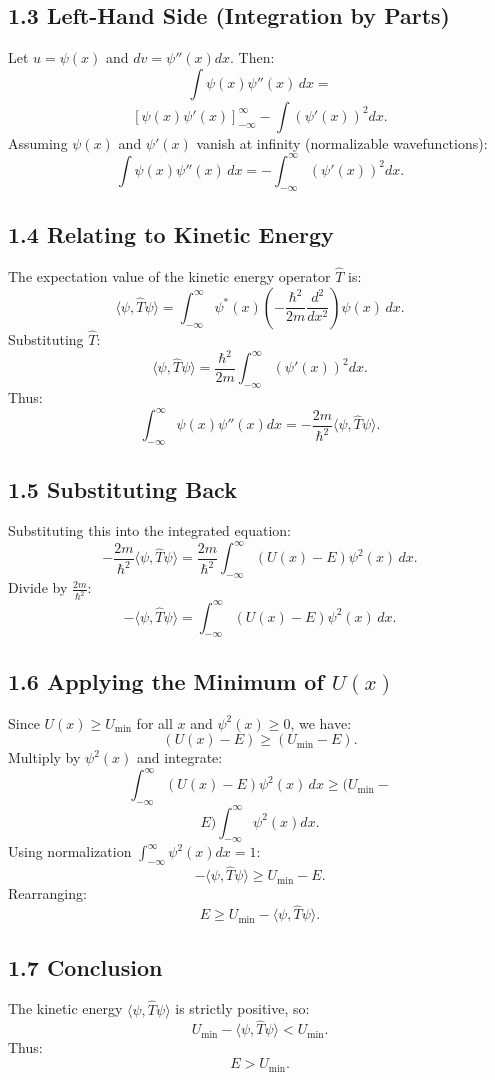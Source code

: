 \documentclass[a4paper,12pt]{article}
\begin{document}
\begin{multicols}{2}
\subsection*{1.3 Left-Hand Side (Integration by Parts)}
Let $u = \psi(x)$ and $dv = \psi''(x) dx$. Then:
\[
\int \psi(x)\psi''(x) \, dx =
\]
\[
\left[\psi(x)\psi'(x)\right]_{-\infty}^\infty - \int \left(\psi'(x)\right)^2 dx.
\]
Assuming $\psi(x)$ and $\psi'(x)$ vanish at infinity (normalizable wavefunctions):
\[
\int \psi(x)\psi''(x) \, dx = - \int_{-\infty}^\infty \left(\psi'(x)\right)^2 dx.
\]

\subsection*{1.4 Relating to Kinetic Energy}
The expectation value of the kinetic energy operator $\hat{T}$ is:
\[
\langle \psi, \hat{T} \psi \rangle = \int_{-\infty}^\infty \psi^*(x) \left(-\frac{\hbar^2}{2m} \frac{d^2}{dx^2}\right) \psi(x) \, dx.
\]
Substituting $\hat{T}$:
\[
\langle \psi, \hat{T} \psi \rangle = \frac{\hbar^2}{2m} \int_{-\infty}^\infty \left(\psi'(x)\right)^2 dx.
\]
Thus:
\[
\int_{-\infty}^\infty \psi(x)\psi''(x) dx = -\frac{2m}{\hbar^2} \langle \psi, \hat{T} \psi \rangle.
\]

\subsection*{1.5 Substituting Back}
Substituting this into the integrated equation:
\[
-\frac{2m}{\hbar^2} \langle \psi, \hat{T} \psi \rangle = \frac{2m}{\hbar^2} \int_{-\infty}^\infty (U(x) - E)\psi^2(x) \, dx.
\]
Divide by $\frac{2m}{\hbar^2}$:
\[
-\langle \psi, \hat{T} \psi \rangle = \int_{-\infty}^\infty (U(x) - E)\psi^2(x) \, dx.
\]

\subsection*{1.6 Applying the Minimum of $U(x)$}
Since $U(x) \geq U_\text{min}$ for all $x$ and $\psi^2(x) \geq 0$, we have:
\[
(U(x) - E) \geq (U_\text{min} - E).
\]
Multiply by $\psi^2(x)$ and integrate:
\[
\int_{-\infty}^\infty (U(x) - E)\psi^2(x) \, dx \geq (U_\text{min} - 
\]
\[
E)\int_{-\infty}^\infty \psi^2(x) dx.
\]
Using normalization $\int_{-\infty}^\infty \psi^2(x) dx = 1$:
\[
-\langle \psi, \hat{T} \psi \rangle \geq U_\text{min} - E.
\]
Rearranging:
\[
E \geq U_\text{min} - \langle \psi, \hat{T} \psi \rangle.
\]

\subsection*{1.7 Conclusion}
The kinetic energy $\langle \psi, \hat{T} \psi \rangle$ is strictly positive, so:
\[
U_\text{min} - \langle \psi, \hat{T} \psi \rangle < U_\text{min}.
\]
Thus:
\[
E > U_\text{min}.
\]


\end{multicols}
\end{document}
